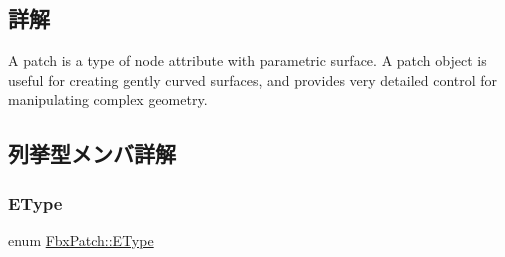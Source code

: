 \subsection{詳解}
A patch is a type of node attribute with parametric surface. A patch object is useful for creating gently curved surfaces, and provides very detailed control for manipulating complex geometry. 

\subsection{列挙型メンバ詳解}
\mbox{\label{class_fbx_patch_ad669936e6b844a7a15fa30ec7c183fbb}} 
\subsubsection{\texorpdfstring{E\+Type}{EType}}
{\footnotesize\ttfamily enum \hyperlink{class_fbx_patch_ad669936e6b844a7a15fa30ec7c183fbb}{Fbx\+Patch\+::\+E\+Type}}

